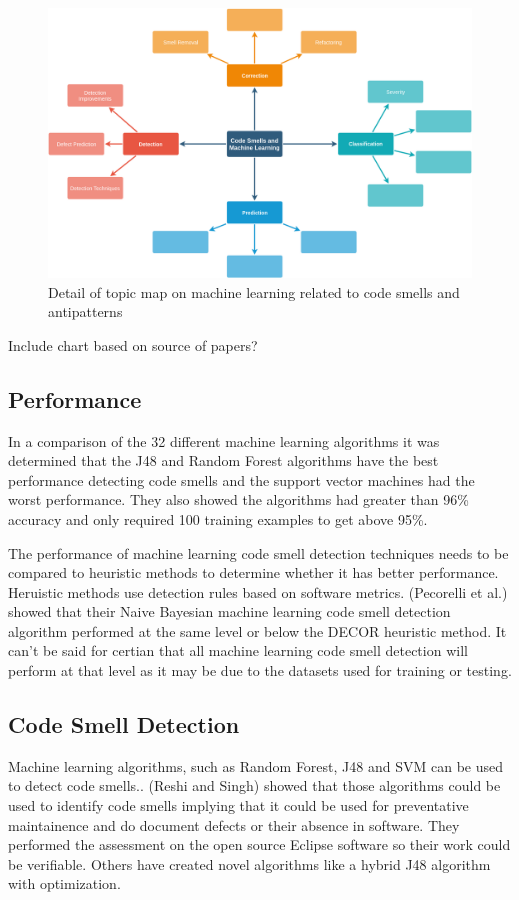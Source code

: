 \documentclass[conference]{IEEEtran}
\begin{document}
\begin{figure}[!ht]
  \centerline{\includegraphics[width=\textwidth]{ML-codesmells.png}}
  \caption{Detail of topic map on machine learning related to code smells and antipatterns}
  \label{fig:ML}
\end{figure} 

Include chart based on source of papers?

\subsection{Performance}
In a comparison of the 32 different machine learning algorithms\cite{arcelli_fontana_comparing_2016} it was determined that the J48 and Random Forest algorithms have the best performance detecting code smells and the support vector machines had the worst performance. They also showed the algorithms had greater than 96\% accuracy and only required 100 training examples to get above 95\%.

The performance of machine learning code smell detection techniques needs to be compared to heuristic methods to determine whether it has better performance. Heruistic methods use detection rules based on software metrics. (Pecorelli et al.) showed\cite{pecorelli_comparing_2019} that their Naive Bayesian machine learning code smell detection algorithm performed at the same level or below the DECOR heuristic method. 
It can't be said for certian that all machine learning code smell detection will perform at that level as it may be due to the datasets used for training or testing.

\subsection{Code Smell Detection}
Machine learning algorithms, such as Random Forest, J48 and SVM can be used to detect code smells.\cite{reshi_investigating_2019}. (Reshi and Singh) showed that those algorithms could be used to identify code smells implying that it could be used for preventative maintainence and do document defects or their absence in software. They performed the assessment on the open source Eclipse software so their work could be verifiable. Others have created novel algorithms\cite{kaur_sp-j48:_2019} like a hybrid J48 algorithm with optimization.
\end{document}
